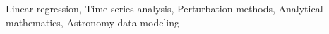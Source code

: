 \documentclass[]{article}
\begin{document}
Linear regression, Time series analysis, Perturbation methods, Analytical mathematics, Astronomy data modeling
\end{document}
